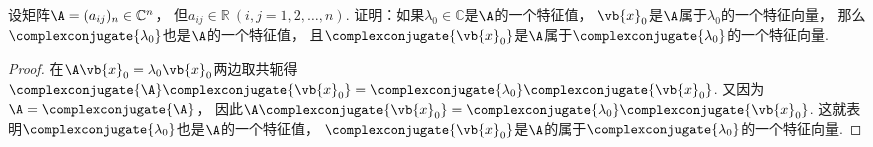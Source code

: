\begin{example}
设矩阵\(\A = (a_{ij})_n \in \mathbb{C}^n\)，
但\(a_{ij} \in \mathbb{R}\ (i,j=1,2,\dotsc,n)\).
证明：如果\(\lambda_0\in\mathbb{C}\)是\(\A\)的一个特征值，
\(\vb{x}_0\)是\(\A\)属于\(\lambda_0\)的一个特征向量，
那么\(\complexconjugate{\lambda_0}\)也是\(\A\)的一个特征值，
且\(\complexconjugate{\vb{x}_0}\)是\(\A\)属于\(\complexconjugate{\lambda_0}\)的一个特征向量.
\begin{proof}
在\(\A\vb{x}_0=\lambda_0\vb{x}_0\)两边取共轭得
\(\complexconjugate{\A}\complexconjugate{\vb{x}_0}
=\complexconjugate{\lambda_0}\complexconjugate{\vb{x}_0}\).
又因为\(\A=\complexconjugate{\A}\)，
因此\(\A\complexconjugate{\vb{x}_0}=\complexconjugate{\lambda_0}\complexconjugate{\vb{x}_0}\).
这就表明\(\complexconjugate{\lambda_0}\)也是\(\A\)的一个特征值，
\(\complexconjugate{\vb{x}_0}\)是\(\A\)的属于\(\complexconjugate{\lambda_0}\)的一个特征向量.
\end{proof}
\end{example}

